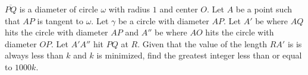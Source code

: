 $\overline{PQ}$ is a diameter of circle $\omega$ with radius $1$ and center $O$. Let $A$ be a point such that $AP$ is tangent to $\omega$. Let $\gamma$ be a circle with diameter $AP$. Let $A'$ be where $AQ$ hits the circle with diameter $AP$ and $A''$ be where $AO$ hits the circle with diameter $OP$. Let $A'A''$ hit $PQ$ at $R$. Given that the value of the length $RA'$ is is always less than $k$ and $k$ is minimized, find the greatest integer less than or equal to $1000k$.

